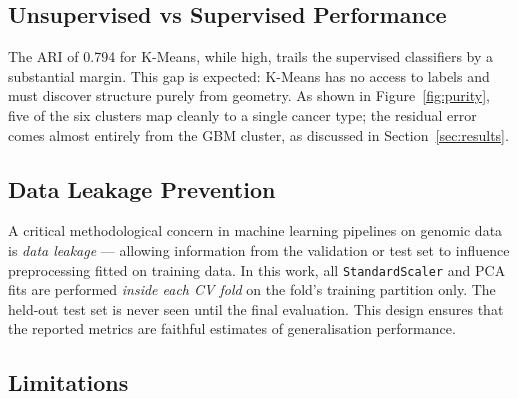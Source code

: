 \documentclass[11pt,letterpaper]{article}
\begin{document}
\subsection{Unsupervised vs Supervised Performance}

The ARI of 0.794 for K-Means, while high, trails the supervised classifiers
by a substantial margin.  This gap is expected: K-Means has no access to labels
and must discover structure purely from geometry.  As shown in
Figure~\ref{fig:purity}, five of the six clusters map cleanly to a single
cancer type; the residual error comes almost entirely from the GBM cluster,
as discussed in Section~\ref{sec:results}.

\subsection{Data Leakage Prevention}

A critical methodological concern in machine learning pipelines on genomic data
is \emph{data leakage} --- allowing information from the validation or test set
to influence preprocessing fitted on training data.  In this work, all
\texttt{StandardScaler} and PCA fits are performed \emph{inside each CV fold}
on the fold's training partition only.  The held-out test set is never seen
until the final evaluation.  This design ensures that the reported metrics are
faithful estimates of generalisation performance.

\subsection{Limitations}
\end{document}
